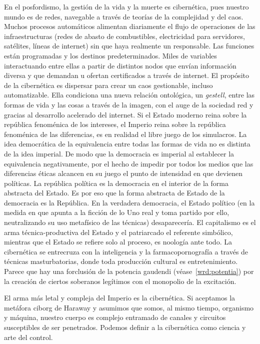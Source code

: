 En el posfordismo, la gestión de la vida y la muerte es cibernética, pues nuestro mundo es de redes, navegable a través de teorías de la complejidad y del caos. Muchos procesos automáticos alimentan diariamente el flujo de operaciones de las infraestructuras (redes de abasto de combustibles, electricidad para servidores, satélites, líneas de internet) sin que haya realmente un responsable. Las funciones están programadas y los destinos predeterminados. Miles de variables interactuando entre ellas a partir de distintos nodos que envían información diversa y que demandan u ofertan certificados a través de internet. El propósito de la cibernética es dispersar para crear un caos gestionable, incluso automatizable. Ella condiciona una nueva relación ontológica, un \emph{gestell}, entre las formas de vida y las cosas a través de la imagen, con el auge de la sociedad red y gracias al desarrollo acelerado del internet. Si el Estado moderno reina sobre la república fenoménica de los intereses, el Imperio reina sobre la república fenoménica de las diferencias, es en realidad el libre juego de los simulacros. La idea democrática de la equivalencia entre todas las formas de vida no es distinta de la idea imperial. De modo que la democracia es imperial al establecer la equivalencia negativamente, por el hecho de impedir por todos los medios que las diferencias éticas alcancen en su juego el punto de intensidad en que devienen políticas. La república política es la democracia en el interior de la forma abstracta del Estado. Es por eso que la forma abstracta de Estado de la democracia es la República. En la verdadera democracia, el Estado político (en la medida en que apunta a la ficción de lo Uno real y toma partido por ello, neutralizando su uso metafísico de las técnicas) desaparecería. El capitalismo es el arma técnica-productiva del Estado y el patriarcado el referente simbólico, mientras que el Estado se refiere solo al proceso, es noología ante todo. La cibernética se entrecruza con la inteligencia y la farmacopornografía a través de técnicas masturbatorias, donde toda producción cultural es entretenimiento. Parece que hay una forclusión de la potencia gaudendi (véase~\ref{wrd:potentia}) por la creación de ciertos soberanos legítimos con el monopolio de la excitación.

El arma más letal y compleja del Imperio es la cibernética. Si aceptamos la metáfora ciborg de Haraway y asumimos que somos, al mismo tiempo, organismo y máquina, nuestro cuerpo es complejo entramado de canales y circuitos susceptibles de ser penetrados. Podemos definir a la cibernética como ciencia y arte del control.

